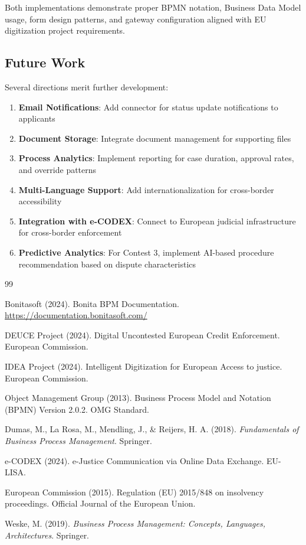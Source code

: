 \documentclass[12pt,a4paper]{article}
\begin{document}
Both implementations demonstrate proper BPMN notation, Business Data Model usage, form design patterns, and gateway configuration aligned with EU digitization project requirements.

\subsection{Future Work}

Several directions merit further development:

\begin{enumerate}
    \item \textbf{Email Notifications}: Add connector for status update notifications to applicants

    \item \textbf{Document Storage}: Integrate document management for supporting files

    \item \textbf{Process Analytics}: Implement reporting for case duration, approval rates, and override patterns

    \item \textbf{Multi-Language Support}: Add internationalization for cross-border accessibility

    \item \textbf{Integration with e-CODEX}: Connect to European judicial infrastructure for cross-border enforcement

    \item \textbf{Predictive Analytics}: For Contest 3, implement AI-based procedure recommendation based on dispute characteristics
\end{enumerate}

\begin{thebibliography}{99}

Bonitasoft (2024). Bonita BPM Documentation. \url{https://documentation.bonitasoft.com/}

DEUCE Project (2024). Digital Uncontested European Credit Enforcement. European Commission.

IDEA Project (2024). Intelligent Digitization for European Access to justice. European Commission.

Object Management Group (2013). Business Process Model and Notation (BPMN) Version 2.0.2. OMG Standard.

Dumas, M., La Rosa, M., Mendling, J., \& Reijers, H. A. (2018). \textit{Fundamentals of Business Process Management}. Springer.

e-CODEX (2024). e-Justice Communication via Online Data Exchange. EU-LISA.

European Commission (2015). Regulation (EU) 2015/848 on insolvency proceedings. Official Journal of the European Union.

Weske, M. (2019). \textit{Business Process Management: Concepts, Languages, Architectures}. Springer.

\end{thebibliography}
\end{document}
